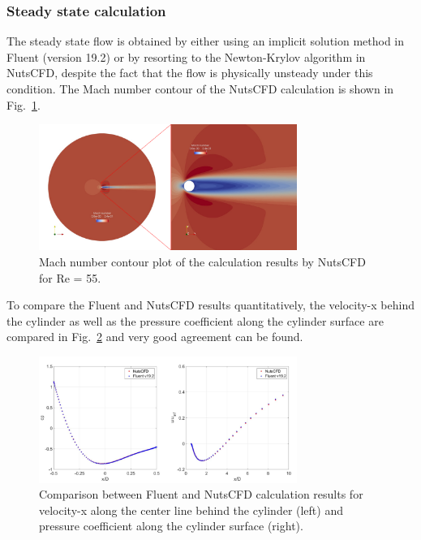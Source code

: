 \documentclass[journal,final]{new-aiaa}
\begin{document}
\subsubsection{Steady state calculation}
The steady state flow is obtained by either using an implicit solution method in
Fluent (version 19.2) or by resorting to the Newton-Krylov algorithm in NutsCFD,
despite the fact that the flow is physically unsteady under this condition. The
Mach number contour of the NutsCFD calculation is shown in Fig.~\ref{fig:cyl-re55}.

\begin{figure}[htb]
	\centering   
	\includegraphics[width=0.75\textwidth]{pic/cylinder-std.png}
	\caption{Mach number contour plot of the calculation results by NutsCFD for Re = 55.}
	\label{fig:cyl-re55}
\end{figure}

To compare the Fluent and NutsCFD results quantitatively, the velocity-x
behind the cylinder as well as the pressure coefficient along the cylinder
surface are compared in Fig.~\ref{fig:cyl-re55-u-cp} and very good agreement
can be found.
\begin{figure}[htb]
	\centering   
	\includegraphics[width=0.75\textwidth]{pic/cylinder-std-compare.png}
	\caption{Comparison between Fluent and NutsCFD calculation results for
		velocity-x along the center line behind the cylinder (left) and pressure
		coefficient along the cylinder surface (right).}
		\label{fig:cyl-re55-u-cp}
\end{figure}
\end{document}
